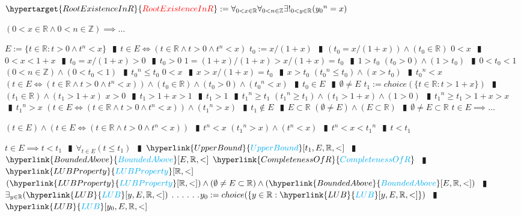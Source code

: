 \documentclass{book}
\newcommand{\df}[1]{\hypertarget{#1}{\textcolor{red}{#1}}}
\newcommand{\rf}[1]{\hyperlink{#1}{\textcolor{cyan}{#1}}}
\newcommand{\abr}{:=}
\newcommand{\cont}{\phantom{.}. . .\phantom{.}}
\newcommand{\pipe}{$\phantom{(}\vrectangleblack\phantom{)}$}
\newcommand{\pr}[1]{\left(#1\right)}
\begin{document}
$\df{RootExistenceInR} \abr \forall_{0 < x \in \mathbb{R}} \forall_{0 < n \in \mathbb{Z}} \exists!_{0 < y \in \mathbb{R}}({y_0}^n = x)$
\begin{enumerate}
  \lit $(0 < x \in \mathbb{R} \land 0 < n \in \mathbb{Z}) \implies \ldots$
  \begin{enumerate}
    \lit $E \abr \{t \in \mathbb{R} : t > 0 \land t^n < x\}$ \pipe $t \in E \iff (t \in \mathbb{R} \land t > 0 \land t^n < x)$
    \lit $t_0 \abr x / (1 + x)$ \pipe $\pr{t_0 = x / (1 + x)} \land (t_0 \in \mathbb{R})$
    \lit $0 < x$ \pipe $0 < x < 1 + x$ \pipe $t_0 = x / (1 + x) > 0$ \pipe $t_0 > 0$
    \lit $1 = (1 + x) / (1 + x) > x / (1 + x) = t_0$ \pipe $1 > t_0$
    \lit $(t_0 > 0) \land (1 > t_0)$ \pipe $0 < t_0 < 1$
    \lit $(0 < n \in \mathbb{Z}) \land (0 < t_0 < 1)$ \pipe ${t_0}^n \leq t_0$
    \lit $0 < x$ \pipe $x > x / (1 + x) = t_0$ \pipe $x > t_0$
    \lit $({t_0}^n \leq t_0) \land (x > t_0)$ \pipe ${t_0}^n < x$
    \lit $\pr{t \in E \iff (t \in \mathbb{R} \land t > 0 \land t^n < x)} \land (t_0 \in \mathbb{R}) \land (t_0 > 0) \land ({t_0}^n < x)$ \pipe $t_0 \in E$ \pipe $\emptyset \neq E$
    \lit $t_1 \abr choice(\{t \in \mathbb{R} : t > 1 + x\})$ \pipe $(t_1 \in \mathbb{R}) \land (t_1 > 1 + x)$
    \lit $x > 0$ \pipe $t_1 > 1 + x > 1$ \pipe $t_1 > 1$ \pipe ${t_1}^n \geq t_1$
    \lit $({t_1}^n \geq t_1) \land (t_1 > 1 + x) \land (1 > 0)$ \pipe ${t_1}^n \geq t_1 > 1 + x > x$ \pipe ${t_1}^n > x$
    \lit $\pr{t \in E \iff (t \in \mathbb{R} \land t > 0 \land t^n < x)} \land ({t_1}^n > x)$ \pipe $t_1 \notin E$ \pipe $E \subset \mathbb{R}$
    \lit $(\emptyset \neq E) \land (E \subset \mathbb{R})$ \pipe $\emptyset \neq E \subset \mathbb{R}$
    \lit $t \in E \implies \ldots$
    \begin{enumerate}
      \lit $(t \in E) \land \pr{t \in E \iff (t \in \mathbb{R} \land t > 0 \land t^n < x)}$ \pipe $t^n < x$
      \lit $({t_1}^n > x) \land (t^n < x)$ \pipe $t^n < x < {t_1}^n$ \pipe $t < t_1$
    \end{enumerate}
    \lit $t \in E \implies t < t_1$ \pipe $\forall_{t \in E}(t \leq t_1)$ \pipe $\rf{UpperBound}[t_1, E, \mathbb{R}, <]$ \pipe $\rf{BoundedAbove}[E, \mathbb{R}, <]$
    \lit $\rf{CompletenessOfR}$ \pipe $\rf{LUBProperty}[\mathbb{R}, <]$
    \lit $(\rf{LUBProperty}[\mathbb{R}, <]) \land (\emptyset \neq E \subset \mathbb{R}) \land (\rf{BoundedAbove}[E, \mathbb{R}, <])$ \pipe $\exists_{y \in \mathbb{R}}(\rf{LUB}[y, E, \mathbb{R}, <])$ \cont
    \lit \cont $y_0 \abr choice(\{y \in \mathbb{R} : \rf{LUB}[y, E, \mathbb{R}, <]\})$ \pipe $\rf{LUB}[y_0, E, \mathbb{R}, <]$

\end{enumerate}
\end{enumerate}
\end{document}
